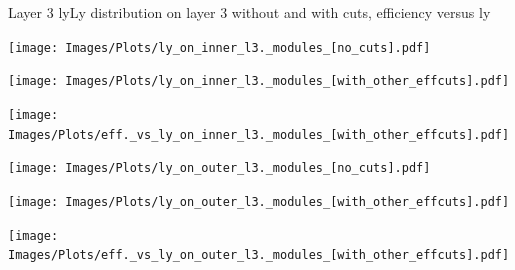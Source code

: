 \documentclass{beamer}
\begin{document}
\begin{frame}{Layer 3 ly}{Ly distribution on layer 3 without and with cuts, efficiency versus ly}
\begin{minipage}{0.32\textwidth}
  \centering
  \texttt{[image: Images/Plots/ly\_on\_inner\_l3.\_modules\_[no\_cuts].pdf]}
\end{minipage}%
\hspace{0.01\textwidth}%
\begin{minipage}{0.32\textwidth}
  \centering
  \texttt{[image: Images/Plots/ly\_on\_inner\_l3.\_modules\_[with\_other\_effcuts].pdf]}
\end{minipage}%
\hspace{0.01\textwidth}%
\begin{minipage}{0.32\textwidth}
  \centering
  \texttt{[image: Images/Plots/eff.\_vs\_ly\_on\_inner\_l3.\_modules\_[with\_other\_effcuts].pdf]}
\end{minipage}
\begin{minipage}{0.32\textwidth}
  \centering
  \texttt{[image: Images/Plots/ly\_on\_outer\_l3.\_modules\_[no\_cuts].pdf]}
\end{minipage}%
\hspace{0.01\textwidth}%
\begin{minipage}{0.32\textwidth}
  \centering
  \texttt{[image: Images/Plots/ly\_on\_outer\_l3.\_modules\_[with\_other\_effcuts].pdf]}
\end{minipage}%
\hspace{0.01\textwidth}%
\begin{minipage}{0.32\textwidth}
  \centering
  \texttt{[image: Images/Plots/eff.\_vs\_ly\_on\_outer\_l3.\_modules\_[with\_other\_effcuts].pdf]}
\end{minipage}
\end{frame}
\end{document}
